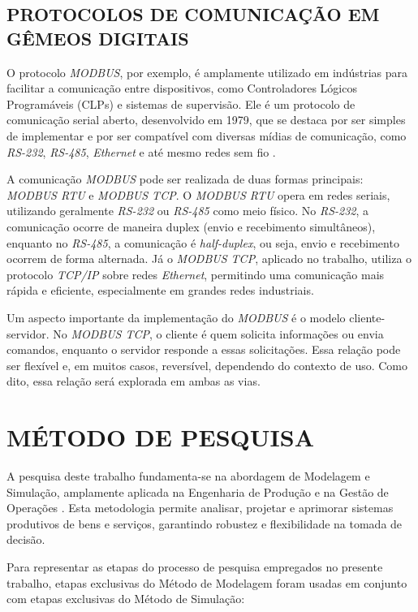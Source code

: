 \documentclass[
    12pt,                %
    openright,           %
    oneside,             %
    a4paper,             %
    english,             %
    spanish,             %
    brazil               %
]{ufscar}
\begin{document}
\section{PROTOCOLOS DE COMUNICAÇÃO EM GÊMEOS DIGITAIS}

O protocolo \textit{MODBUS}, por exemplo, é amplamente utilizado em indústrias para facilitar a comunicação entre dispositivos, como Controladores Lógicos Programáveis (CLPs) e sistemas de supervisão. Ele é um protocolo de comunicação serial aberto, desenvolvido em 1979, que se destaca por ser simples de implementar e por ser compatível com diversas mídias de comunicação, como \textit{RS-232}, \textit{RS-485}, \textit{Ethernet} e até mesmo redes sem fio \cite{tamboli_implementation_2015}.

A comunicação \textit{MODBUS} pode ser realizada de duas formas principais: \textit{MODBUS RTU} e \textit{MODBUS TCP}. O \textit{MODBUS RTU} opera em redes seriais, utilizando geralmente \textit{RS-232} ou \textit{RS-485} como meio físico. No \textit{RS-232}, a comunicação ocorre de maneira duplex (envio e recebimento simultâneos), enquanto no \textit{RS-485}, a comunicação é \textit{half-duplex}, ou seja, envio e recebimento ocorrem de forma alternada. Já o \textit{MODBUS TCP}, aplicado no trabalho, utiliza o protocolo \textit{TCP/IP} sobre redes \textit{Ethernet}, permitindo uma comunicação mais rápida e eficiente, especialmente em grandes redes industriais.

Um aspecto importante da implementação do \textit{MODBUS} é o modelo cliente-servidor. No \textit{MODBUS TCP}, o cliente é quem solicita informações ou envia comandos, enquanto o servidor responde a essas solicitações. Essa relação pode ser flexível e, em muitos casos, reversível, dependendo do contexto de uso. Como dito, essa relação será explorada em ambas as vias.

\chapter{MÉTODO DE PESQUISA}

A pesquisa deste trabalho fundamenta-se na abordagem de Modelagem e Simulação, amplamente aplicada na Engenharia de Produção e na Gestão de Operações \cite{ganga_metodologia_2011}. Esta metodologia permite analisar, projetar e aprimorar sistemas produtivos de bens e serviços, garantindo robustez e flexibilidade na tomada de decisão. 

Para representar as etapas do processo de pesquisa empregados no presente trabalho, etapas exclusivas do Método de Modelagem foram usadas em conjunto com etapas exclusivas do Método de Simulação:
\end{document}
